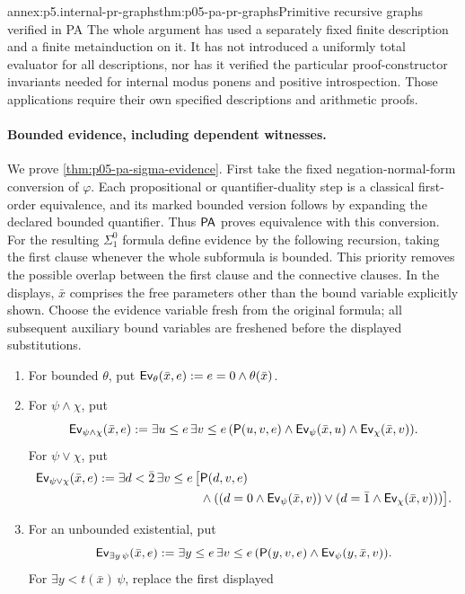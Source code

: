 \begin{annexitem}{annex:p5.internal-pr-graphs}{thm:p05-pa-pr-graphs}{Primitive recursive graphs verified in PA}
The whole argument has used a separately fixed finite description and a
finite metainduction on it.  It has not introduced a uniformly total
evaluator for all descriptions, nor has it verified the particular
proof-constructor invariants needed for internal modus ponens and positive
introspection.  Those applications require their own specified descriptions
and arithmetic proofs.

\paragraph{Bounded evidence, including dependent witnesses.}
We prove \cref{thm:p05-pa-sigma-evidence}.  First take the fixed
negation-normal-form conversion of \(\varphi\).  Each propositional or
quantifier-duality step is a classical first-order equivalence, and its
marked bounded version follows by expanding the declared bounded
quantifier.  Thus \(\mathsf{PA}\) proves equivalence with this conversion.
For the resulting \(\Sigma^0_1\) formula define evidence by the following
recursion, taking the first clause whenever the whole subformula is bounded.
This priority removes the possible overlap between the first clause and
the connective clauses.  In the displays, \(\bar x\) comprises the free
parameters other than the bound variable explicitly shown.
Choose the evidence variable fresh from the original formula; all subsequent
auxiliary bound variables are freshened before the displayed substitutions.
\begin{enumerate}
\item For bounded \(\theta\), put
\(\mathsf{Ev}_\theta(\bar x,e)\mathrel{:=} e=0\land\theta(\bar x)\).
\item For \(\psi\land\chi\), put
\[
 \mathsf{Ev}_{\psi\land\chi}(\bar x,e)\mathrel{:=}
 \exists u\leq e\,\exists v\leq e\,
 (\mathsf P(u,v,e)\land\mathsf{Ev}_\psi(\bar x,u)
                         \land\mathsf{Ev}_\chi(\bar x,v)).
\]
For \(\psi\lor\chi\), put
\[
\begin{split}
 \mathsf{Ev}_{\psi\lor\chi}(\bar x,e)\mathrel{:=}
 \exists d<\bar2\,\exists v\leq e\,\bigl[
 &\mathsf P(d,v,e)\\
 &\land((d=0\land\mathsf{Ev}_\psi(\bar x,v))
       \lor(d=\bar1\land\mathsf{Ev}_\chi(\bar x,v)))\bigr].
\end{split}
\]
\item For an unbounded existential, put
\[
 \mathsf{Ev}_{\exists y\,\psi}(\bar x,e)\mathrel{:=}
 \exists y\leq e\,\exists v\leq e\,
   (\mathsf P(y,v,e)\land\mathsf{Ev}_\psi(y,\bar x,v)).
\]
For \(\exists y<t(\bar x)\,\psi\), replace the first displayed

\end{enumerate}
\end{annexitem}
